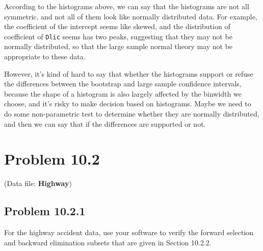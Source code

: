 \documentclass[12pt,oneside,a4paper]{article}\usepackage[]{graphicx}\usepackage[]{xcolor}
\newcommand{\problem}[1]
{
    \clearpage
    \section*{Problem {#1}}
}
\newcommand{\subproblem}[1]
{
    \subsection*{Problem {#1}}
}
\newcommand{\m}[1]{\texttt{{#1}}}
\begin{document}
According to the histograms above, we can say that the histograms are not all symmetric, and not all of them look like normally distributed data. For example, the coefficient of the intercept seems like skewed, and the distribution of coefficient of \m{Dlic} seems has two peaks, suggesting that they may not be normally distributed, so that the large sample normal theory may not be appropriate to these data. 

However, it's kind of hard to say that whether the histograms support or refuse the differences between the bootstrap and large sample confidence intervals, because the shape of a histogram is also largely affected by the binwidth we choose, and it's risky to make decision based on histograms. Maybe we need to do some non-parametric test to determine whether they are normally distributed, and then we can say that if the differences are supported or not.

\problem{10.2}
(Data file: \textbf{Highway})

\subproblem{10.2.1}
For the highway accident data, use your software to verify the forward selection and backward elimination subsets that are given in Section 10.2.2.
\end{document}
